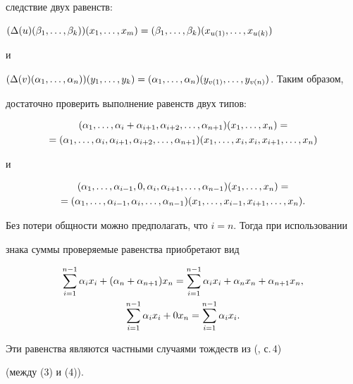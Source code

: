 \begin{pf}
следствие двух равенств:


$(\Delta(u)(\be_1,\dotsc,\be_k))(x_1,\dotsc,x_m)=


(\be_1,\dotsc,\be_k)(x_{u(1)},\dotsc,x_{u(k)})$


и


$(\Delta(v)(\al_1,\dotsc,\al_n))(y_1,\dotsc,y_k)=\linebreak 


(\al_1,\dotsc,\al_n)(y_{v(1)},\dotsc,y_{v(n)})$. Таким образом,


достаточно проверить выполнение равенств двух типов:


\begin{multline*}


(\al_1,\dotsc,\al_i+\al_{i+1},\al_{i+2},\dotsc,\al_{n+1})(x_1,\dotsc,x_n)=\\


=(\al_1,\dotsc,\al_i,\al_{i+1},\al_{i+2},\dotsc,\al_{n+1})(x_1,\dotsc,x_i,x_i,


x_{i+1},\dotsc,x_n)


\end{multline*}


и


\begin{multline*}


(\al_1,\dotsc,\al_{i-1},0,\al_{i},\al_{i+1},\dotsc,


\al_{n-1})(x_1,\dotsc,x_n)=\\


=(\al_1,\dotsc,\al_{i-1},\al_{i},\dotsc,\al_{n-1})


(x_1,\dotsc,x_{i-1},x_{i+1},\dotsc, x_n).


\end{multline*}


Без потери общности можно предполагать, что $i=n$. Тогда при использовании


знака суммы проверяемые равенства приобретают вид


\begin{gather*}


\sum\limits_{i=1}^{n-1} \al_i x_i+(\al_n+\al_{n+1})x_n=


\sum\limits_{i=1}^{n-1} \al_i x_i+\al_n x_n+\al_{n+1}x_n,\\


\sum\limits_{i=1}^{n-1} \al_i x_i+ 0 x_n=


\sum\limits_{i=1}^{n-1} \al_i x_i.


\end{gather*}


Эти равенства являются частными случаями тождеств из (\cite{Sc1}, с.\,4)


(между (3) и (4)).


\end{pf}






